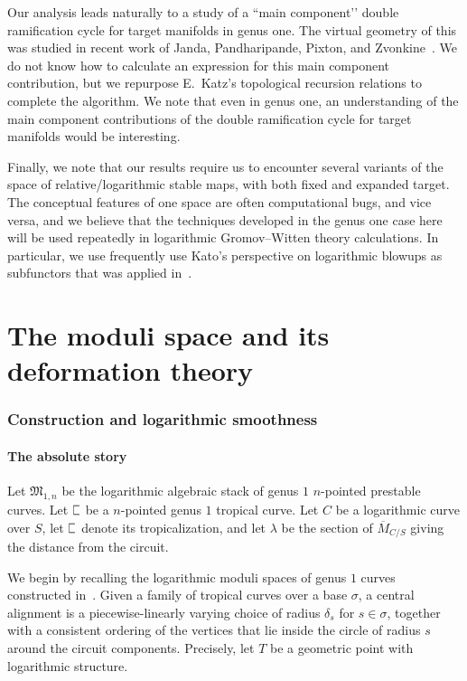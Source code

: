 \documentclass[11pt]{amsart}
\newcommand{\plC}{\scalebox{0.8}[1.3]{$\sqsubset$}}
\theoremstyle{definition}
\theoremstyle{definition}
\begin{document}
Our analysis leads naturally to a study of a ``main component’’ double ramification cycle for target manifolds in genus one. The virtual geometry of this was studied in recent work of Janda, Pandharipande, Pixton, and Zvonkine~\cite{DRCBundle}. We do not know how to calculate an expression for this main component contribution, but we repurpose E.~Katz's topological recursion relations \cite{EKatz} to complete the algorithm. We note that even in genus one, an understanding of the main component contributions of the double ramification cycle for target manifolds would be interesting.

Finally, we note that our results require us to encounter several variants of the space of relative/logarithmic stable maps, with both fixed and expanded target. The conceptual features of one space are often computational bugs, and vice versa, and we believe that the techniques developed in the genus one case here will be used repeatedly in logarithmic Gromov--Witten theory calculations. In particular, we use frequently use Kato's perspective on logarithmic blowups as subfunctors that was applied in~\cite{RSPW,RSPW2}. 

\part{The moduli space and its deformation theory}

\section{Construction and logarithmic smoothness}

\subsection{The absolute story} Let $\mathfrak M_{1,n}$ be the logarithmic algebraic stack of genus $1$ $n$-pointed prestable curves. Let $\plC$ be a $n$-pointed genus $1$ tropical curve. Let $C$ be a logarithmic curve over $S$, let $\plC$ denote its tropicalization, and let $\lambda$ be the section of $\overline{M}_{C/S}$ giving the distance from the circuit. 

We begin by recalling the logarithmic moduli spaces of genus $1$ curves constructed in~\cite[Sections 2 \& 4]{RSPW}. Given a family of tropical curves over a base $\sigma$, a central alignment is a piecewise-linearly varying choice of radius $\delta_s$ for $s\in\sigma$, together with a consistent ordering of the vertices that lie inside the circle of radius $s$ around the circuit components. Precisely, let $T$ be a geometric point with logarithmic structure.
\end{document}
